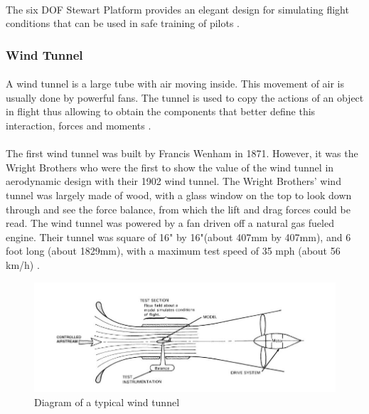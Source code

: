\paragraph{}The six DOF Stewart Platform provides an elegant design for simulating flight conditions that can be used in safe training of pilots
\cite{stewart1965platform}.
\subsubsection{Wind Tunnel}
\paragraph{}
A wind tunnel is a large tube with air moving inside. This movement of air is usually done by powerful fans. The tunnel is used to copy the actions of an object in flight thus allowing
to obtain the components that better define this interaction, forces and moments \cite{morris_force_2010}.
\paragraph{} The first wind tunnel was built by
Francis Wenham in 1871. However, it was the Wright Brothers who were the first to show the value of the wind tunnel in aerodynamic design with their 1902 wind tunnel.  The Wright Brothers’ wind tunnel was largely made of wood, with a glass window on the top to look down through and see the force balance, from which the
lift and drag forces could be read. The wind tunnel was powered by a fan driven off a natural gas fueled engine. Their tunnel was square of 16" by 16"(about 407mm by 407mm), and 6 foot long (about 1829mm), with a maximum test speed of 35 mph (about 56 km/h) \cite{fernandes_design_nodate}.
	\begin{figure}[!h]
	\includegraphics{Figures/Fig2}
	\caption{Diagram of a typical wind tunnel}
	\end{figure}
